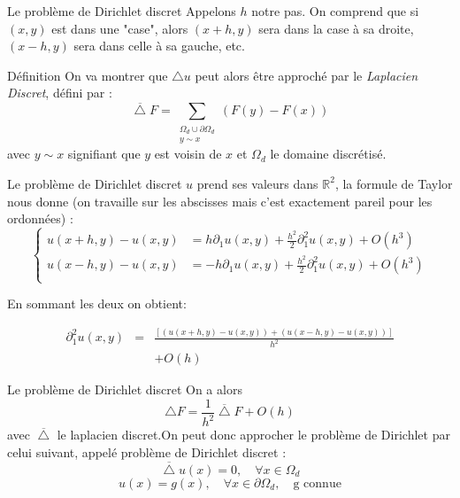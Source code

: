 \documentclass{beamer}
\begin{document}
\begin{frame}{Le problème de Dirichlet discret}
    Appelons $h$ notre pas. On comprend que si $(x,y)$ est dans une "case",
    alors $(x+h, y)$ sera dans la case à sa droite, $(x-h, y)$ sera dans celle
    à sa gauche, etc.  \medbreak

    \begin{block}{Définition}
        On va montrer que $\bigtriangleup u$ peut
        alors être approché par le \emph{Laplacien Discret}, défini par :
        \[
            \overline{\bigtriangleup}F = \sum\limits_{\substack{\Omega_d \cup \partial \Omega_d \\ y \sim x}} (F(y) - F(x))
        \]
        avec $y\sim x$ signifiant que $y$ est voisin de $x$ et $\Omega_d$ le domaine discrétisé.
    \end{block}

\end{frame}


\begin{frame}{Le problème de Dirichlet discret}
    $u$ prend ses valeurs dans $\mathbb{R}^2$, la formule de Taylor nous donne
    (on travaille sur les abscisses mais c'est exactement pareil pour les
    ordonnées) :
    \[
        \begin{cases}
            u(x+h,y) - u(x,y) &=  h\partial_1 u(x,y) + \frac{h^2}{2}\partial_1^2 u(x,y)+ O(h^3)\\
            u(x-h,y) - u(x,y) &=  -h\partial_1 u(x,y) + \frac{h^2}{2}\partial_1^2 u(x,y)+ O(h^3)\\
        \end{cases}
    \]
    \begin{block}{En sommant les deux on obtient:}

        \begin{eqnarray*}
            \partial_1^2 u(x,y)&=& \frac{\left[(u(x+h,y) - u(x,y)) + (u(x-h,y) - u(x,y)) \right]}{h^2} \\
            & & + O(h)
        \end{eqnarray*}
    \end{block}

\end{frame}

\begin{frame}{Le problème de Dirichlet discret}
    On a alors
    \[
    \bigtriangleup F = \frac{1}{h^2}\overline{\bigtriangleup}F + O(h)
    \]
    avec $\overline{\bigtriangleup}$ le laplacien discret.On peut donc
    approcher le problème de Dirichlet par celui suivant, appelé problème de
    Dirichlet discret :
    \[\overline{\bigtriangleup} u(x) = 0, \quad \forall x \in \Omega_d\]
    \[u(x) = g(x), \quad \forall x \in \partial \Omega_d, \quad \text{g connue}\]
\end{frame}
\end{document}
